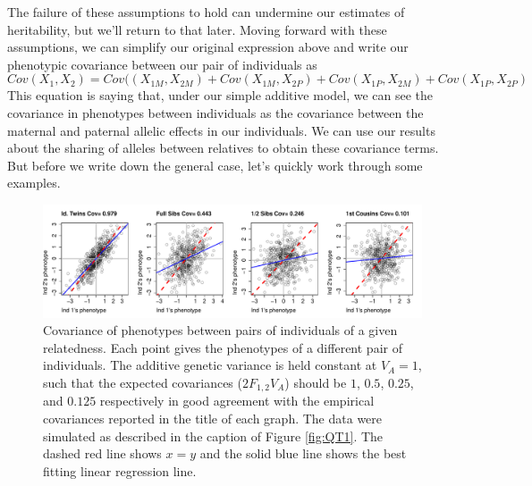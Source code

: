 The failure of these assumptions
to hold can undermine our estimates of heritability, but we'll
return to that later. Moving forward with these assumptions, we can
simplify our original expression above and write our phenotypic covariance between our pair of individuals as
\begin{equation}
Cov(X_1,X_2) =
Cov((X_{1M},X_{2M})+Cov(X_{1M},X_{2P})+Cov(X_{1P},X_{2M})
+Cov(X_{1P},X_{2P}) \label{cov_rels_1}
\end{equation}
This equation is saying that, under our simple additive model, we can see the
covariance in phenotypes between individuals as the covariance between
the maternal and paternal allelic effects in our individuals. We can use our results about
the sharing of alleles between relatives to obtain these covariance terms.
But before we write down the general case, let's quickly work through some
examples. \\

 \begin{figure}
 \begin{center}
 \includegraphics[width=\textwidth]{figures/Varying_rellys_phenos.pdf}
 \end{center}
 \caption{Covariance of phenotypes between pairs of individuals of a
   given relatedness. Each point gives the phenotypes of a different
   pair of individuals. The additive genetic variance is held constant
   at $V_A=1$, such that the expected covariances ($2F_{1,2}V_A$)
   should be $1$, $0.5$, $0.25$, and $0.125$ respectively in good agreement with
   the empirical covariances reported in the title of each graph. The
   data were simulated as described in
 the caption of Figure \ref{fig:QT1}. The dashed red line shows $x=y$ and the solid blue
line shows the best fitting linear regression line. }\label{fig:Varying_rellys_phenos}
 \end{figure}
 

